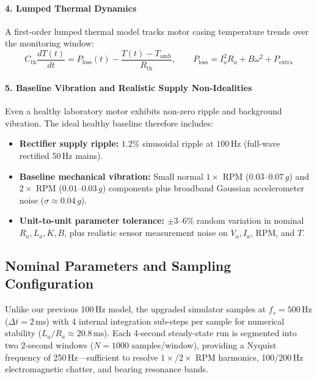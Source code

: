 \documentclass[11pt,a4paper]{article}
\begin{document}
\paragraph{4. Lumped Thermal Dynamics}
A first-order lumped thermal model tracks motor casing temperature trends over the monitoring window:
\begin{equation}
    C_{\text{th}} \frac{dT(t)}{dt} = P_{\text{loss}}(t) - \frac{T(t) - T_{\text{amb}}}{R_{\text{th}}}, \qquad P_{\text{loss}} = I_a^2 R_a + B\omega^2 + P_{\text{extra}}
    \label{eq:thermal}
\end{equation}

\paragraph{5. Baseline Vibration and Realistic Supply Non-Idealities}
Even a healthy laboratory motor exhibits non-zero ripple and background vibration. The ideal healthy baseline therefore includes:
\begin{itemize}[noitemsep]
    \item \textbf{Rectifier supply ripple:} $1.2\%$ sinusoidal ripple at $100\,\text{Hz}$ (full-wave rectified 50\,Hz mains).
    \item \textbf{Baseline mechanical vibration:} Small normal $1\times$ RPM ($0.03\text{--}0.07\,g$) and $2\times$ RPM ($0.01\text{--}0.03\,g$) components plus broadband Gaussian accelerometer noise ($\sigma \approx 0.04\,g$).
    \item \textbf{Unit-to-unit parameter tolerance:} $\pm 3\text{--}6\%$ random variation in nominal $R_a, L_a, K, B$, plus realistic sensor measurement noise on $V_a, I_a$, RPM, and $T$.
\end{itemize}

\subsection{Nominal Parameters and Sampling Configuration}

Unlike our previous 100\,Hz model, the upgraded simulator samples at \textbf{$f_s = 500\,\text{Hz}$} ($\Delta t = 2\,\text{ms}$) with 4 internal integration sub-steps per sample for numerical stability ($L_a/R_a \approx 20.8\,\text{ms}$). Each 4-second steady-state run is segmented into two 2-second windows ($N = 1000$ samples/window), providing a Nyquist frequency of 250\,Hz—sufficient to resolve $1\times$/$2\times$ RPM harmonics, 100/200\,Hz electromagnetic chatter, and bearing resonance bands.
\end{document}
